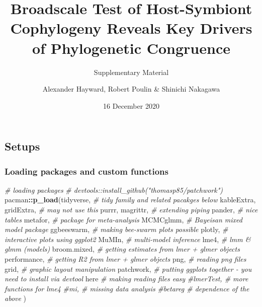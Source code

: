\documentclass[
]{article}
\title{Broadscale Test of Host-Symbiont Cophylogeny Reveals Key Drivers of
Phylogenetic Congruence}
\subtitle{Supplementary Material}
\author{Alexander Hayward, Robert Poulin \& Shinichi Nakagawa}
\date{16 December 2020}
\newenvironment{Shaded}{\begin{snugshade}}{\end{snugshade}}
\newcommand{\CommentTok}[1]{\textcolor[rgb]{0.56,0.35,0.01}{\textit{#1}}}
\newcommand{\KeywordTok}[1]{\textcolor[rgb]{0.13,0.29,0.53}{\textbf{#1}}}
\newcommand{\NormalTok}[1]{#1}
\newcommand{\OperatorTok}[1]{\textcolor[rgb]{0.81,0.36,0.00}{\textbf{#1}}}
\begin{document}
\maketitle

{
\setcounter{tocdepth}{2}
\tableofcontents
}
\hypertarget{setups}{%
\subsection{Setups}\label{setups}}

\hypertarget{loading-packages-and-custom-functions}{%
\subsubsection{Loading packages and custom
functions}\label{loading-packages-and-custom-functions}}

\begin{Shaded}
\begin{Highlighting}[]
\CommentTok{# loading packages}
\CommentTok{# devtools::install_github("thomasp85/patchwork")}
\NormalTok{pacman}\OperatorTok{::}\KeywordTok{p_load}\NormalTok{(tidyverse, }\CommentTok{# tidy family and related pacakges below}
\NormalTok{               kableExtra, }
\NormalTok{               gridExtra, }\CommentTok{# may not use this}
\NormalTok{               purrr,}
\NormalTok{               magrittr, }\CommentTok{# extending piping}
\NormalTok{               pander,   }\CommentTok{# nice tables}
\NormalTok{               metafor,  }\CommentTok{# package for meta-analysis}
\NormalTok{               MCMCglmm,  }\CommentTok{# Bayeisan mixed model package}
\NormalTok{               ggbeeswarm, }\CommentTok{# making bee-swarm plots possible}
\NormalTok{               plotly,     }\CommentTok{# interactive plots using ggplot2}
\NormalTok{               MuMIn,  }\CommentTok{# multi-model inference}
\NormalTok{               lme4,   }\CommentTok{# lmm & glmm (models)}
\NormalTok{               broom.mixed, }\CommentTok{# getting estimates from lmer + glmer objects}
\NormalTok{               performance, }\CommentTok{# getting R2 from lmer + glmer objects}
\NormalTok{               png,         }\CommentTok{# reading png files}
\NormalTok{               grid,        }\CommentTok{# graphic layout manipulation}
\NormalTok{               patchwork,   }\CommentTok{# putting ggplots together - you need to install via devtool}
\NormalTok{               here         }\CommentTok{# making reading files easy}
               \CommentTok{#lmerTest,   # more functions for lme4}
               \CommentTok{#mi,      # missing data analysis}
               \CommentTok{#betareg   # dependence of the above}
\NormalTok{)}
\end{Highlighting}
\end{Shaded}
\end{document}
